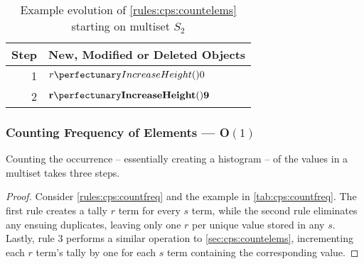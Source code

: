 \begin{table} \centering
   \begin{tabular}{|r|l|}
    \hline
    \textbf{Step} & \textbf{New, Modified or Deleted Objects} \\ \hline
    1 & \(\cpfunc{r}{0}\)\\ \hline
    
    2 & \(\mathbf{\cpfunc{r}{9}}\)\\ \hline
\end{tabular}
\caption[Example evolution of \cref{rules:cps:countelems}]{\label{tab:cps:countelems}Example evolution of \cref{rules:cps:countelems} starting on multiset \(S_2\)}
\end{table}

\subsubsection{Counting Frequency of Elements --- O\((1)\)}\label{sec:cps:countfreq}

\begin{proposition}\label{prop:cps:countfreq}
Counting the occurrence -- essentially creating a histogram -- of the values in a multiset takes three steps.
\end{proposition}

\begin{proof}
Consider \cref{rules:cps:countfreq} and the example in \cref{tab:cps:countfreq}.  The first rule creates a tally \(r\) term for every \(s\) term, while the second rule eliminates any ensuing duplicates, leaving only one \(r\) per unique value stored in any \(s\).  Lastly, rule 3 performs a similar operation to \cref{sec:cps:countelems}, incrementing each \(r\) term's tally by one for each \(s\) term containing the corresponding value.
\end{proof}

\begin{cprulesetfloat}
\begin{cpruleset}


\end{cpruleset}
\caption{\label{rules:cps:countfreq}Ruleset to count the occurrence frequency of elements in a multiset}
\end{cprulesetfloat}

